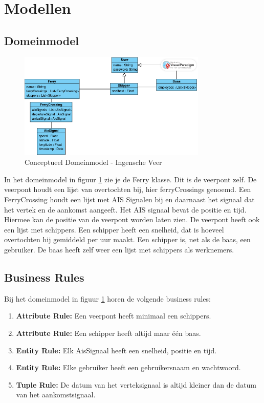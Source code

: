 \documentclass{article}
\begin{document}
\section{Modellen}
\subsection{Domeinmodel}
\begin{figure}[H]
    \centering
    \includegraphics[width=0.8\textwidth]{images/ConceptueelKlassendiagram.png}
    \caption{Conceptueel Domeinmodel - Ingensche Veer}
    \label{fig:dm}
\end{figure}
In het domeinmodel in figuur \ref{fig:dm} zie je de Ferry klasse. Dit is de veerpont zelf. De veerpont houdt een lijst van overtochten bij, hier ferryCrossings genoemd. Een FerryCrossing houdt een lijst met AIS Signalen bij en daarnaast het signaal dat het vertek en de aankomst aangeeft. Het AIS signaal bevat de positie en tijd. Hiermee kan de positie van de veerpont worden laten zien.
De veerpont heeft ook een lijst met schippers. Een schipper heeft een snelheid, dat is hoeveel overtochten hij gemiddeld per uur maakt. Een schipper is, net als de baas, een gebruiker. De baas heeft zelf weer een lijst met schippers als werknemers.

\subsection{Business Rules}
Bij het domeinmodel in  figuur \ref{fig:dm} horen de volgende business rules:
\begin{enumerate}
    \item \textbf{Attribute Rule:} Een veerpont heeft minimaal een schippers.
    \item \textbf{Attribute Rule:} Een schipper heeft altijd maar één baas.
    \item \textbf{Entity Rule:} Elk AisSignaal heeft een snelheid, positie en tijd.
    \item \textbf{Entity Rule:} Elke gebruiker heeft een gebruikersnaam en wachtwoord.
    \item \textbf{Tuple Rule:} De datum van het verteksignaal is altijd kleiner dan de datum van het aankomstsignaal.
\end{enumerate} 
\end{document}
